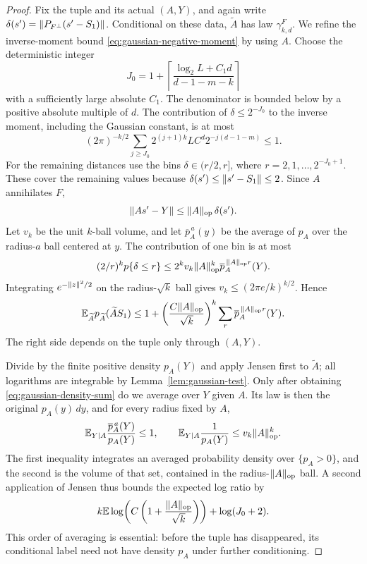\begin{proof}
Fix the tuple and its actual $(A,Y)$, and again write
$\delta(s')=\lVert P_{F^\perp}(s'-S_1)\rVert$. Conditional on these data,
$\widetilde A$ has law $\gamma_{k,d}^{F}$. We refine the inverse-moment
bound \eqref{eq:gaussian-negative-moment} by using $A$.
Choose the deterministic integer
\begin{equation}\label{eq:gaussian-cutoff}
 J_0=1+\left\lceil
       \frac{\log_2 L+C_1d}{d-1-m-k}\right\rceil
\end{equation}
with a sufficiently large absolute $C_1$. The denominator is bounded
below by a positive absolute multiple of $d$. The contribution of
$\delta\le2^{-J_0}$ to the inverse moment, including the Gaussian constant,
is at most
\[
 (2\pi)^{-k/2}
 \sum_{j\ge J_0}2^{(j+1)k}LC^d2^{-j(d-1-m)}\le1.
\]
For the remaining distances use the bins
$\delta\in(r/2,r]$, where $r=2,1,\ldots,2^{-J_0+1}$.
These cover the remaining values because $\delta(s')\le\lVert s'-S_1\rVert\le2$.
Since $A$ annihilates $F$,
\[
 \lVert As'-Y\rVert\le\lVert A\rVert_{\mathrm{op}}\,\delta(s').
\]
Let $v_k$ be the unit $k$-ball volume, and let
$\overline p_A^{\,a}(y)$ be the average of $p_A$ over the radius-$a$ ball
centered at $y$. The contribution of one bin is at most
\[
 (2/r)^k p\{\delta\le r\}
 \le 2^k v_k\lVert A\rVert_{\mathrm{op}}^{k}
       \overline p_A^{\,\lVert A\rVert_{\mathrm{op}}r}(Y).
\]
Integrating $e^{-\lVert z\rVert^2/2}$ on the radius-$\sqrt{k}$ ball gives
$v_k\le(2\pi e/k)^{k/2}$. Hence
\begin{equation}\label{eq:gaussian-density-sum}
 \mathbb E_{\widetilde A}p_{\widetilde A}(\widetilde A S_1)
 \le1+\left(\frac{C\lVert A\rVert_{\mathrm{op}}}{\sqrt{k}}\right)^k
       \sum_r\overline p_A^{\,\lVert A\rVert_{\mathrm{op}}r}(Y).
\end{equation}
The right side depends on the tuple only through $(A,Y)$.

Divide by the finite positive density $p_A(Y)$ and apply Jensen first to
$\widetilde A$; all logarithms are integrable by
Lemma~\ref{lem:gaussian-test}. Only after obtaining
\eqref{eq:gaussian-density-sum} do we average over $Y$ given $A$.
Its law is then the original $p_A(y)\,dy$, and for every radius fixed by $A$,
\[
 \mathbb E_{Y\mid A}\frac{\overline p_A^{\,a}(Y)}{p_A(Y)}\le1,\qquad
 \mathbb E_{Y\mid A}\frac1{p_A(Y)}
 \le v_k\lVert A\rVert_{\mathrm{op}}^{k}.
\]
The first inequality integrates an averaged probability density over
$\{p_A>0\}$, and the second is the volume of that set, contained in the
radius-$\lVert A\rVert_{\mathrm{op}}$ ball. A second application of Jensen thus bounds
the expected log ratio by
\begin{equation}\label{eq:gaussian-density-jensen}
 k\mathbb E\log\!\left(C\left(1+\frac{\lVert A\rVert_{\mathrm{op}}}{\sqrt{k}}\right)\right)
       +\log(J_0+2).
\end{equation}
This order of averaging is essential: before the tuple has disappeared,
its conditional label need not have density $p_A$ under further conditioning.


\end{proof}
